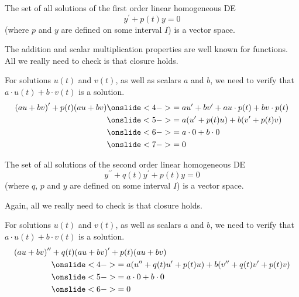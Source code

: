 \documentclass{beamer}
\begin{document}
\begin{frame}
\begin{example}
The set of all solutions of the first order linear homogeneous DE
\begin{equation*}
y^\prime+p(t)y=0
\end{equation*}
(where $p$ and $y$ are defined on some interval $I$) is a vector space.

\vspace{0.25cm}
The addition and scalar multiplication properties are well known for functions. All we really need to check is that closure holds.\pause
{}

\vspace{0.25cm}
For solutions $u(t)$ and $v(t)$, as well as scalars $a$ and $b$, we need to verify that $a\cdot u(t)+b\cdot v(t)$ is a solution.
\begin{equation*}
\begin{split}
{(au+bv)}^\prime+p(t)(au+bv)&\onslide<4->{=au^\prime+bv^\prime+au\cdot p(t)+bv\cdot p(t)}\\
&\onslide<5->{=a(u^\prime+p(t)u)+b(v^\prime+p(t)v)}\\
&\onslide<6->{=a\cdot 0+b\cdot 0}\\
&\onslide<7->{=0}
\end{split}
\end{equation*}
\end{example}
\end{frame}

\begin{frame}
\begin{example}
The set of all solutions of the second order linear homogeneous DE
\begin{equation*}
y^{\prime\prime}+q(t)y^\prime+p(t)y=0
\end{equation*}
(where $q$, $p$ and $y$ are defined on some interval $I$) is a vector space.

\vspace{0.25cm}
Again, all we really need to check is that closure holds.\pause
{}

\vspace{0.25cm}
For solutions $u(t)$ and $v(t)$, as well as scalars $a$ and $b$, we need to verify that $a\cdot u(t)+b\cdot v(t)$ is a solution.
\begin{equation*}
\begin{split}
{(au+bv)}^{\prime\prime}&+q(t){(au+bv)}^\prime+p(t)(au+bv)\\
&\onslide<4->{=a(u^{\prime\prime}+q(t)u^\prime+p(t)u)+b(v^{\prime\prime}+q(t)v^\prime+p(t)v)}\\
&\onslide<5->{=a\cdot 0+b\cdot 0}\\
&\onslide<6->{=0}
\end{split}
\end{equation*}
\end{example}
\end{frame}
\end{document}
